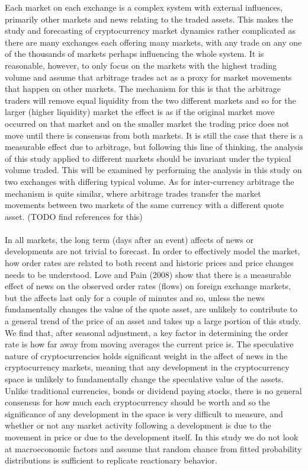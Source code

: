 \documentclass[a4paper,10pt]{article}
\begin{document}
Each market on each exchange is a complex system with external influences, primarily other markets and news relating to the traded assets. This makes the study and forecasting of cryptocurrency market dynamics rather complicated as there are many exchanges each offering many markets, with any trade on any one of the thousands of markets perhaps influencing the whole system. It is reasonable, however, to only focus on the markets with the highest trading volume and assume that arbitrage trades act as a proxy for market movements that happen on other markets. The mechanism for this is that the arbitrage traders will remove equal liquidity from the two different markets and so for the larger (higher liquidity) market the effect is as if the original market move occurred on that market and on the smaller market the trading price does not move until there is consensus from both markets. It is still the case that there is a measurable effect due to arbitrage, but following this line of thinking, the analysis of this study applied to different markets should be invariant under the typical volume traded. This will be examined by performing the analysis in this study on two exchanges with differing typical volume. As for inter-currency arbitrage the mechanism is quite similar, where arbitrage trades transfer the market movements between two markets of the same currency with a different quote asset. (TODO find references for this)\\ \\
In all markets, the long term (days after an event) affects of news or developments are not trivial to forecast. In order to effectively model the market, how order rates are related to both recent and historic prices and price changes needs to be understood. Love and Pain (2008) show that there is a measurable effect of news on the observed order rates (flows) on foreign exchange markets, but the affects last only for a couple of minutes\cite{newsandorderflows} and so, unless the news fundamentally changes the value of the quote asset, are unlikely to contribute to a general trend of the price of an asset and takes up a large portion of this study. We find that, after seasonal adjustment, a key factor in determining the order rate is how far away from moving averages the current price is. The speculative nature of cryptocurrencies holds significant weight in the affect of news in the cryptocurrency markets, meaning that any development in the cryptocurrency space is unlikely to fundamentally change the speculative value of the assets. Unlike traditional currencies, bonds or dividend paying stocks, there is no general consensus for how much each cryptocurrency should be worth and so the significance of any development in the space is very difficult to measure, and whether or not any market activity following a development is due to the movement in price or due to the development itself. In this study we do not look at macroeconomic factors and assume that random chance from fitted probability distributions is sufficient to replicate reactionary behavior. \\ \\
\end{document}
